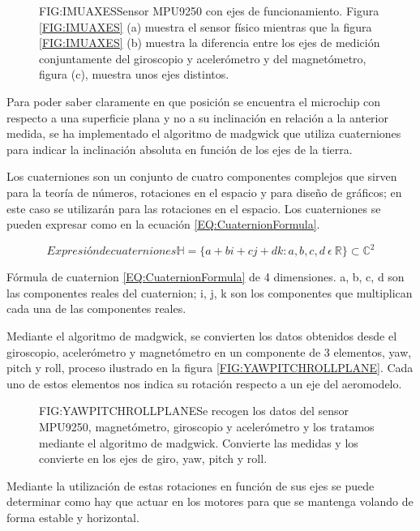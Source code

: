\begin{figure}[IMU con ejes de medición]{FIG:IMUAXES}{Sensor MPU9250 con ejes de funcionamiento. Figura \ref{FIG:IMUAXES} (a) muestra el sensor físico mientras que la figura \ref{FIG:IMUAXES} (b) muestra la diferencia entre los ejes de medición conjuntamente del giroscopio y acelerómetro y del magnetómetro, figura (c), muestra unos ejes distintos.}
\end{figure}
 
 Para poder saber claramente en que posición se encuentra el microchip con respecto a una superficie plana y no a su inclinación en relación a la anterior medida, se ha implementado el algoritmo de madgwick\cite{Act2012} que utiliza cuaterniones para indicar la inclinación absoluta en función de los ejes de la tierra. 
 
 Los cuaterniones\cite{Graves1999} son un conjunto de cuatro componentes complejos que sirven para la teoría de números, rotaciones en el espacio y para diseño de gráficos; en este caso se utilizarán para las rotaciones en el espacio. Los cuaterniones se pueden expresar como en la ecuación \ref{EQ:CuaternionFormula}.
 
\begin{equation}[EQ:CuaternionFormula]{Expresión de cuaterniones}
	{\mathbb{H}= \{ {a+bi+cj+dk:a,b,c,d\:\epsilon\:\mathbb{R}} \} \subset  \mathbb{C}^{2}}
	\end{equation}
	
	Fórmula de cuaternion \ref{EQ:CuaternionFormula} de 4 dimensiones. a, b, c, d son las componentes reales del cuaternion; i, j, k  son los componentes que multiplican cada una de las componentes reales.

   Mediante el algoritmo de madgwick, se convierten los datos obtenidos desde el giroscopio, acelerómetro y magnetómetro en un componente de 3 elementos, yaw, pitch y roll, proceso ilustrado en la figura \ref{FIG:YAWPITCHROLLPLANE}.
   Cada uno de estos elementos nos indica su rotación respecto a un eje del aeromodelo. 
 

\begin{figure}[Ejes yaw, pitch y roll]{FIG:YAWPITCHROLLPLANE}{Se recogen los datos del sensor MPU9250, magnetómetro, giroscopio y acelerómetro y los tratamos mediante el algoritmo de madgwick. Convierte las medidas y los convierte en los ejes de giro, yaw, pitch y roll.}
\end{figure}
 
 Mediante la utilización de estas rotaciones en función de sus ejes se puede determinar como hay que actuar en los motores para que se mantenga volando de forma estable y horizontal.
  


